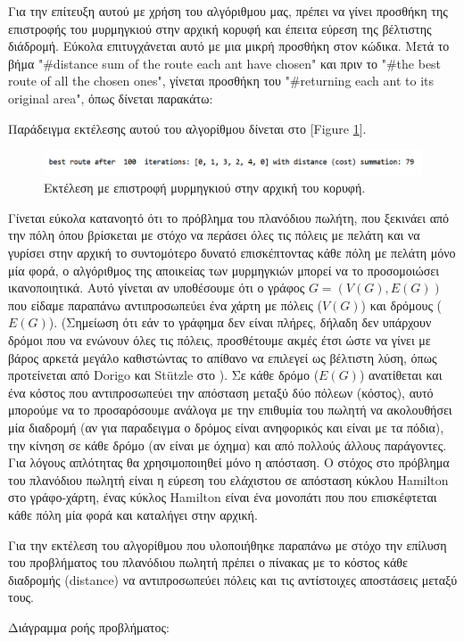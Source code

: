 Για την επίτευξη αυτού με χρήση του αλγόριθμου μας, πρέπει να γίνει προσθήκη της επιστροφής του μυρμηγκιού στην αρχική κορυφή και έπειτα εύρεση της βέλτιστης διάδρομή. Εύκολα επιτυγχάνεται αυτό με μια μικρή προσθήκη στον κώδικα. Μετά το βήμα "\#distance sum of the route each ant have chosen" και πριν το "\#the best route of all the chosen ones", γίνεται προσθήκη του "\#returning each ant to its original area", όπως δίνεται παρακάτω:

Παράδειγμα εκτέλεσης αυτού του αλγορίθμου δίνεται στο [Figure \ref{exret}].
\begin{figure}
    \centering
    \includegraphics[scale=0.55]{2947_thesis/pictures/ex7.png} 
    \caption{Εκτέλεση με επιστροφή μυρμηγκιού στην αρχική του κορυφή.}
    \label{exret}
\end{figure}

Γίνεται εύκολα κατανοητό ότι το πρόβλημα του πλανόδιου πωλήτη, που ξεκινάει από την πόλη όπου βρίσκεται με στόχο να περάσει όλες τις πόλεις με πελάτη και να γυρίσει στην αρχική το συντομότερο δυνατό επισκέπτοντας κάθε πόλη με πελάτη μόνο μία φορά, ο αλγόριθμος της αποικείας των μυρμηγκιών μπορεί να το προσομοιώσει ικανοποιητικά. 
Αυτό γίνεται αν υποθέσουμε ότι ο γράφος $G=(V(G), E(G))$  που είδαμε παραπάνω αντιπροσωπεύει ένα χάρτη με πόλεις ($V(G)$) και δρόμους ($E(G)$). (Σημείωση ότι εάν το γράφημα δεν είναι πλήρες, δήλαδη δεν υπάρχουν δρόμοι που να ενώνουν όλες τις πόλεις, προσθέτουμε ακμές έτσι ώστε να γίνει με βάρος αρκετά μεγάλο καθιστώντας το απίθανο να επιλεγεί ως βέλτιστη λύση, όπως προτείνεται από Dorigo και Stützle στο \cite{dorigo2004ant}). Σε κάθε δρόμο ($E(G)$) ανατίθεται και ένα κόστος που αντιπροσωπεύει την απόσταση μεταξύ δύο πόλεων (κόστος), αυτό μπορούμε να το προσαρόσουμε ανάλογα με την επιθυμία του πωλητή να ακολουθήσει μία διαδρομή (αν για παραδειγμα ο δρόμος είναι ανηφορικός και είναι με τα πόδια), την κίνηση σε κάθε δρόμο (αν είναι με όχημα) και από πολλούς άλλους παράγοντες. Για λόγους απλότητας θα χρησιμοποιηθεί μόνο η απόσταση. Ο στόχος στο πρόβλημα του πλανόδιου πωλητή είναι η εύρεση του ελάχιστου σε απόσταση κύκλου Hamilton στο γράφο-χάρτη, ένας κύκλος Hamilton είναι ένα μονοπάτι που που επισκέφτεται κάθε πόλη μία φορά και καταλήγει στην αρχική. \cite{dorigo2004ant}

Για την εκτέλεση του αλγορίθμου που υλοποιήθηκε παραπάνω με στόχο την επίλυση του προβλήματος του πλανόδιου πωλητή πρέπει ο πίνακας με το κόστος κάθε διαδρομής (distance) να αντιπροσωπεύει πόλεις και τις αντίστοιχες αποστάσεις μεταξύ τους. 

Διάγραμμα ροής προβλήματος: 






